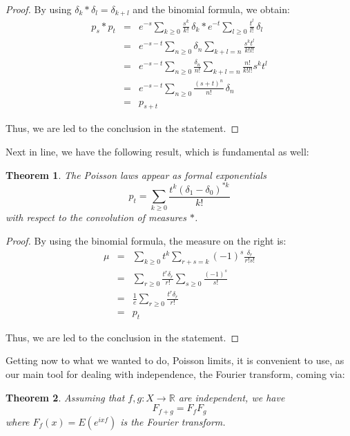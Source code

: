 \documentclass[12pt]{amsbook}
\newtheorem{theorem}{Theorem}[chapter]
\begin{document}
\begin{proof}
By using $\delta_k*\delta_l=\delta_{k+l}$ and the binomial formula, we obtain:
\begin{eqnarray*}
p_s*p_t
&=&e^{-s}\sum_{k\geq0}\frac{s^k}{k!}\,\delta_k*e^{-t}\sum_{l\geq0}\frac{t^l}{l!}\,\delta_l\\
&=&e^{-s-t}\sum_{n\geq0}\delta_n\sum_{k+l=n}\frac{s^kt^l}{k!l!}\\
&=&e^{-s-t}\sum_{n\geq0}\frac{\delta_n}{n!}\sum_{k+l=n}\frac{n!}{k!l!}s^kt^l\\\
&=&e^{-s-t}\sum_{n\geq0}\frac{(s+t)^n}{n!}\,\delta_n\\
&=&p_{s+t}
\end{eqnarray*}

Thus, we are led to the conclusion in the statement.
\end{proof}

Next in line, we have the following result, which is fundamental as well:


\begin{theorem}
The Poisson laws appear as formal exponentials
$$p_t=\sum_{k\geq0}\frac{t^k(\delta_1-\delta_0)^{*k}}{k!}$$
with respect to the convolution of measures $*$.
\end{theorem}

\begin{proof}
By using the binomial formula, the measure on the right is:
\begin{eqnarray*}
\mu
&=&\sum_{k\geq0}t^k\sum_{r+s=k}(-1)^s\frac{\delta_r}{r!s!}\\
&=&\sum_{r\geq0}\frac{t^r\delta_r}{r!}\sum_{s\geq0}\frac{(-1)^s}{s!}\\
&=&\frac{1}{e}\sum_{r\geq0}\frac{t^r\delta_r}{r!}\\
&=&p_t
\end{eqnarray*}

Thus, we are led to the conclusion in the statement.
\end{proof}

Getting now to what we wanted to do, Poisson limits, it is convenient to use, as our main tool for dealing with independence, the Fourier transform, coming via:


\begin{theorem}
Assuming that $f,g:X\to\mathbb R$ are independent, we have
$$F_{f+g}=F_fF_g$$
where $F_f(x)=E(e^{ixf})$ is the Fourier transform.
\end{theorem}
\end{document}
